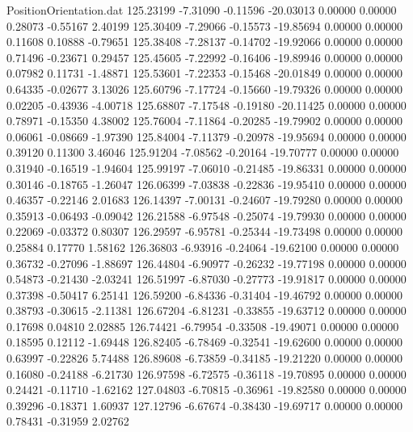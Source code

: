 \begin{filecontents}{PositionOrientation.dat}
 125.23199   -7.31090   -0.11596   -20.03013    0.00000    0.00000    0.28073   -0.55167    2.40199
 125.30409   -7.29066   -0.15573   -19.85694    0.00000    0.00000    0.11608    0.10888   -0.79651
 125.38408   -7.28137   -0.14702   -19.92066    0.00000    0.00000    0.71496   -0.23671    0.29457
 125.45605   -7.22992   -0.16406   -19.89946    0.00000    0.00000    0.07982    0.11731   -1.48871
 125.53601   -7.22353   -0.15468   -20.01849    0.00000    0.00000    0.64335   -0.02677    3.13026
 125.60796   -7.17724   -0.15660   -19.79326    0.00000    0.00000    0.02205   -0.43936   -4.00718
 125.68807   -7.17548   -0.19180   -20.11425    0.00000    0.00000    0.78971   -0.15350    4.38002
 125.76004   -7.11864   -0.20285   -19.79902    0.00000    0.00000    0.06061   -0.08669   -1.97390
 125.84004   -7.11379   -0.20978   -19.95694    0.00000    0.00000    0.39120    0.11300    3.46046
 125.91204   -7.08562   -0.20164   -19.70777    0.00000    0.00000    0.31940   -0.16519   -1.94604
 125.99197   -7.06010   -0.21485   -19.86331    0.00000    0.00000    0.30146   -0.18765   -1.26047
 126.06399   -7.03838   -0.22836   -19.95410    0.00000    0.00000    0.46357   -0.22146    2.01683
 126.14397   -7.00131   -0.24607   -19.79280    0.00000    0.00000    0.35913   -0.06493   -0.09042
 126.21588   -6.97548   -0.25074   -19.79930    0.00000    0.00000    0.22069   -0.03372    0.80307
 126.29597   -6.95781   -0.25344   -19.73498    0.00000    0.00000    0.25884    0.17770    1.58162
 126.36803   -6.93916   -0.24064   -19.62100    0.00000    0.00000    0.36732   -0.27096   -1.88697
 126.44804   -6.90977   -0.26232   -19.77198    0.00000    0.00000    0.54873   -0.21430   -2.03241
 126.51997   -6.87030   -0.27773   -19.91817    0.00000    0.00000    0.37398   -0.50417    6.25141
 126.59200   -6.84336   -0.31404   -19.46792    0.00000    0.00000    0.38793   -0.30615   -2.11381
 126.67204   -6.81231   -0.33855   -19.63712    0.00000    0.00000    0.17698    0.04810    2.02885
 126.74421   -6.79954   -0.33508   -19.49071    0.00000    0.00000    0.18595    0.12112   -1.69448
 126.82405   -6.78469   -0.32541   -19.62600    0.00000    0.00000    0.63997   -0.22826    5.74488
 126.89608   -6.73859   -0.34185   -19.21220    0.00000    0.00000    0.16080   -0.24188   -6.21730
 126.97598   -6.72575   -0.36118   -19.70895    0.00000    0.00000    0.24421   -0.11710   -1.62162
 127.04803   -6.70815   -0.36961   -19.82580    0.00000    0.00000    0.39296   -0.18371    1.60937
 127.12796   -6.67674   -0.38430   -19.69717    0.00000    0.00000    0.78431   -0.31959    2.02762

\end{filecontents}
